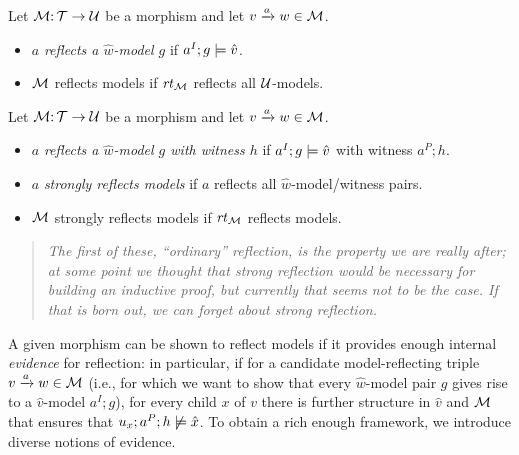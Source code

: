 \begin{definition}
Let ${\mathcal{M}}{:}\, {\mathcal{T}}\rightarrow{\mathcal{U}}$ be a morphism and let ${v}\xrightarrow{a}{w}\in{\mathcal{M}}$.
\begin{itemize}
\item $a$ \emph{reflects a $\hat w$-model $g$} if $a^I;g\models \hat v$.

\item ${\mathcal{M}}$ reflects models if $\mathit{rt}_{{\mathcal{M}}}$ reflects all ${\mathcal{U}}$-models.
\end{itemize}
\end{definition}
%
\begin{definition}
Let ${\mathcal{M}}{:}\, {\mathcal{T}}\rightarrow{\mathcal{U}}$ be a morphism and let ${v}\xrightarrow{a}{w}\in{\mathcal{M}}$.
\begin{itemize}
\item $a$ \emph{reflects a $\hat w$-model $g$ with witness $h$} if $a^I;g\models \hat v$ with witness $a^P;h$.
	
\item $a$ \emph{strongly reflects models} if $a$ reflects all $\hat w$-model/witness pairs.
		
\item ${\mathcal{M}}$ strongly reflects models if $\mathit{rt}_{{\mathcal{M}}}$ reflects models.
\end{itemize}
\end{definition}
%
\begin{quote}\it
The first of these, ``ordinary'' reflection, is the property we are really after; at some point we thought that strong reflection would be necessary for building an inductive proof, but currently that seems not to be the case. If that is born out, we can forget about strong reflection.
\end{quote}
%
A given morphism can be shown to reflect models if it provides enough internal \emph{evidence} for reflection: in particular, if for a candidate model-reflecting triple ${v}\xrightarrow{a}{w}\in {\mathcal{M}}$ (i.e., for which we want to show that every $\hat w$-model pair $g$ gives rise to a $\hat v$-model $a^I;g$), for every child $x$ of $v$ there is further structure in $\hat v$ and ${\mathcal{M}}$ that ensures that $u_x;a^P;h\not\models \hat x$. To obtain a rich enough framework, we introduce diverse notions of evidence.

